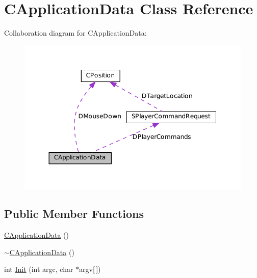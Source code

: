 \hypertarget{classCApplicationData}{}\section{C\+Application\+Data Class Reference}
\label{classCApplicationData}


Collaboration diagram for C\+Application\+Data\+:\nopagebreak
\begin{figure}[H]
\begin{center}
\leavevmode
\includegraphics[width=350pt]{classCApplicationData__coll__graph}
\end{center}
\end{figure}
\subsection*{Public Member Functions}
\begin{DoxyCompactItemize}
\item 
\hyperlink{classCApplicationData_a3d496acbdfac67ca25ee028d0703c492}{C\+Application\+Data} ()
\item 
\hyperlink{classCApplicationData_ada8893519d385d721320c9dea0fc7001}{$\sim$\+C\+Application\+Data} ()
\item 
int \hyperlink{classCApplicationData_ab757e7ad037decb18cefa3f4ad2e1298}{Init} (int argc, char $\ast$argv\mbox{[}$\,$\mbox{]})
\end{DoxyCompactItemize}
